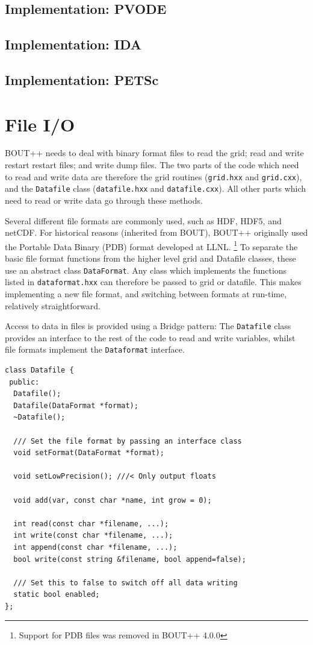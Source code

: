 \documentclass[12pt]{article}
\newcommand{\code}[1]{\texttt{#1}}
\begin{document}
\subsection{Implementation: PVODE}


\subsection{Implementation: IDA}

\subsection{Implementation: PETSc}

\section{File I/O}

BOUT++ needs to deal with binary format files to read the grid;
read and write restart restart files; and write dump files. 
The two parts of the code which need to read and write data are therefore
the grid routines (\code{grid.hxx} and \code{grid.cxx}), and the
\code{Datafile} class (\code{datafile.hxx} and \code{datafile.cxx}).
All other parts which need to read or write data go through these
methods.

Several different file formats are commonly used, such as HDF, HDF5, and netCDF.
For historical reasons (inherited from BOUT), BOUT++ originally used the
Portable Data Binary (PDB) format developed at LLNL.
%
\footnote{Support for PDB files was removed in BOUT++ 4.0.0}
%
To separate the basic file format functions from the higher level grid and
Datafile classes, these use an abstract class \code{DataFormat}. Any
class which implements the functions listed in \code{dataformat.hxx}
can therefore be passed to grid or datafile. This makes implementing
a new file format, and switching between formats at run-time,
relatively straightforward.


Access to data in files is provided using a Bridge pattern: The
\code{Datafile} class provides an interface to the rest of the code
to read and write variables, whilst file formats implement the
\code{Dataformat} interface. 
\begin{lstlisting}
class Datafile {
 public:
  Datafile();
  Datafile(DataFormat *format);
  ~Datafile();
  
  /// Set the file format by passing an interface class
  void setFormat(DataFormat *format);

  void setLowPrecision(); ///< Only output floats

  void add(var, const char *name, int grow = 0);

  int read(const char *filename, ...);
  int write(const char *filename, ...);
  int append(const char *filename, ...);
  bool write(const string &filename, bool append=false);

  /// Set this to false to switch off all data writing
  static bool enabled;
};
\end{lstlisting}
\end{document}
